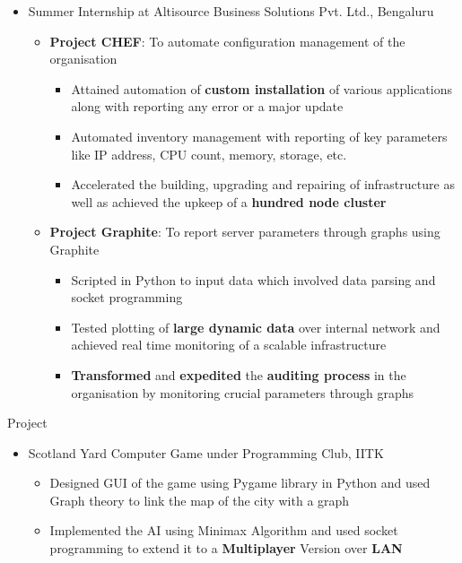 \documentclass{article}
\begin{document}
\begin{itemize}[leftmargin=0.07cm]
\item {\large Summer Internship at Altisource Business Solutions Pvt. Ltd., Bengaluru}\hspace*{\fill}
\vspace{-0cm}
	\begin{itemize}[leftmargin=0.07cm]
	\item \textbf{Project CHEF}: To automate configuration management of the organisation\\
	\vspace{-0.2cm}
	\begin{itemize}
	\item Attained automation of \textbf{custom installation} of various applications along with reporting any error or a major update
	\item Automated inventory management with reporting  of key parameters like IP address, CPU count, memory, storage, etc.
    \item Accelerated the building, upgrading and repairing of infrastructure as well as achieved the upkeep of a \textbf{hundred node cluster} \end{itemize}
	\vspace{0cm}
	\item \textbf{Project Graphite}: To report server parameters through graphs using Graphite\\
	\vspace{-0.2cm}
	\begin{itemize}
	\item Scripted in Python to input data which involved data parsing and socket programming
	\item Tested plotting of \textbf{large dynamic data} over internal network and achieved real time monitoring of a scalable infrastructure 
	\item \textbf{Transformed} and \textbf{expedited} the \textbf{auditing process} in the organisation by monitoring crucial parameters through graphs 
	\end{itemize}
	
	\end{itemize}
\end{itemize}
{\Large Project}
\renewcommand{\labelitemii}{$\bullet$}
\begin{itemize}[leftmargin=0.07cm]
\item {\large Scotland Yard Computer Game under} {\large Programming Club, IITK}\hspace*{\fill}
	\begin{itemize}
	\item Designed GUI of the game using Pygame library in Python and used Graph theory to link the map of the city with a graph
	\item Implemented the AI using Minimax Algorithm and used socket programming to extend it to a \textbf{Multiplayer} Version over \textbf{LAN}
	\end{itemize}
	\end{itemize}
\end{document}
